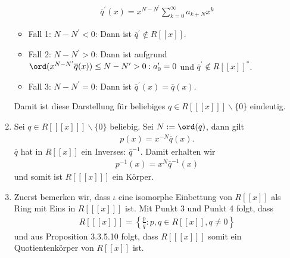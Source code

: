 \begin{solution}
\begin{enumerate}
  \begin{align*}
    \overline{q}^{\prime}(x) = x^{N-N^{\prime}}\sum_{k = 0}^{\infty}a_{k+N}x^k
  \end{align*}
  \begin{itemize}
    \item Fall 1: $N-N^{\prime} < 0$: Dann ist $\overline{q}^{\prime} \notin R[[x]]$.
    \item Fall 2: $N-N^{\prime} > 0$: Dann ist aufgrund
    $\ord(x^{N-N^{\prime}}\overline{q}(x)) \leq N - N^{\prime} > 0: a_0^{\prime} = 0$
    und $\overline{q}^{\prime} \notin R[[x]]^*$.
    \item Fall 3: $N-N^{\prime} = 0$: Dann ist $\overline{q}^{\prime}(x) = \overline{q}(x)$.
  \end{itemize}
  Damit ist diese Darstellung für beliebiges $q \in R[[[x]]]\backslash \{0\}$ eindeutig.
  \item Sei $q \in R[[[x]]]\backslash \{0\}$ beliebig. Sei $N := \ord(q)$, dann gilt
  \begin{align*}
    p(x) = x^{-N}\overline{q}(x).
  \end{align*}
  $\overline{q}$ hat in $R[[x]]$ ein Inverses: $\overline{q}^{-1}$. Damit erhalten wir
  \begin{align*}
    p^{-1}(x) = x^N\overline{q}^{-1}(x)
  \end{align*}
  und somit ist $R[[[x]]]$ ein Körper.
  \item Zuerst bemerken wir, dass $\iota$ eine isomorphe Einbettung von $R[[x]]$
  als Ring mit Eins in $R[[[x]]]$ ist. Mit Punkt 3 und Punkt 4 folgt, dass
  \begin{align*}
    R[[[x]]] = \left\{\frac{p}{q}: p, q \in R[[x]], q \neq 0 \right\}
  \end{align*}
  und aus Proposition 3.3.5.10 folgt, dass $R[[[x]]]$ somit ein Quotientenkörper
  von $R[[x]]$ ist.
\end{enumerate}
\end{solution}
